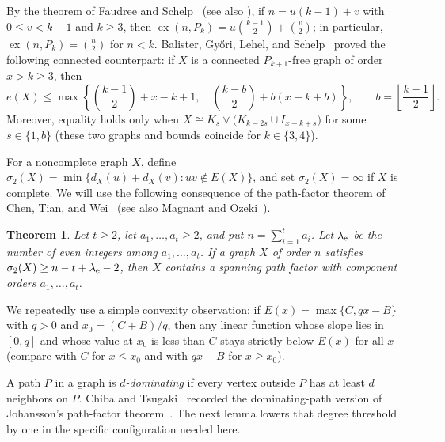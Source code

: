 \documentclass[10pt]{article}
\theoremstyle{compactplain}
\newtheorem{theorem}{Theorem}[section]
\theoremstyle{remark}\newtheorem{remark}[theorem]{Remark}
\newcommand{\ex}{\operatorname{ex}}
\begin{document}
By the theorem of Faudree and Schelp~\cite{FS} (see also
\cite[Theorem~1.2]{BGLS}), if $n=u(k-1)+v$ with $0\le v<k-1$ and
$k\ge3$, then $\ex(n,P_k)=u\binom{k-1}{2}+\binom{v}{2}$; in particular,
$\ex(n,P_k)=\binom{n}{2}$ for $n<k$. Balister, Gy\H{o}ri, Lehel, and
Schelp~\cite[Theorem~1.3]{BGLS} proved the following connected
counterpart: if $X$ is a connected $P_{k+1}$-free graph of order
$x>k\ge3$, then
\begin{equation}\label{eq:bgls}
 e(X)\le\max\left\{
 \binom{k-1}{2}+x-k+1,\quad
 \binom{k-b}{2}+b(x-k+b)\right\},
 \qquad b=\left\lfloor\frac{k-1}{2}\right\rfloor.
\end{equation}
Moreover, equality holds only when
$X\cong K_s\vee\bigl(K_{k-2s}\mathbin{\dot\cup}I_{x-k+s}\bigr)$ for some
$s\in\{1,b\}$ (these two graphs and bounds coincide for $k\in\{3,4\}$).

For a noncomplete graph $X$, define
$\sigma_2(X)=\min\{d_X(u)+d_X(v):uv\notin E(X)\}$, and set
$\sigma_2(X)=\infty$ if $X$ is complete. We will use the following
consequence of the path-factor theorem of Chen, Tian, and Wei~\cite{CTW}
(see also Magnant and Ozeki~\cite[Theorem~1.2]{MO}).

\begin{theorem}\label{thm:ctw}
Let $t\ge2$, let $a_1,\ldots,a_t\ge2$, and put $n=\sum_{i=1}^t a_i$. Let
$\lambda_{\rm e}$ be the number of even integers among
$a_1,\ldots,a_t$. If a graph $X$ of order $n$ satisfies
$\sigma_2(X)\ge n-t+\lambda_{\rm e}-2$, then $X$ contains a spanning
path factor with component orders $a_1,\ldots,a_t$.
\end{theorem}

We repeatedly use a simple convexity observation: if
$E(x)=\max\{C,qx-B\}$ with $q>0$ and $x_0=(C+B)/q$, then any linear
function whose slope lies in $[0,q]$ and whose value at $x_0$ is less
than $C$ stays strictly below $E(x)$ for all $x$ (compare with $C$ for
$x\le x_0$ and with $qx-B$ for $x\ge x_0$).

A path $P$ in a graph is \emph{$d$-dominating} if every vertex outside
$P$ has at least $d$ neighbors on $P$. Chiba and
Tsugaki~\cite[Lemma~2.2]{ChibaTsugaki} recorded the dominating-path
version of Johansson's path-factor theorem~\cite{Johansson}. The next
lemma lowers that degree threshold by one in the specific configuration
needed here.
\end{document}
